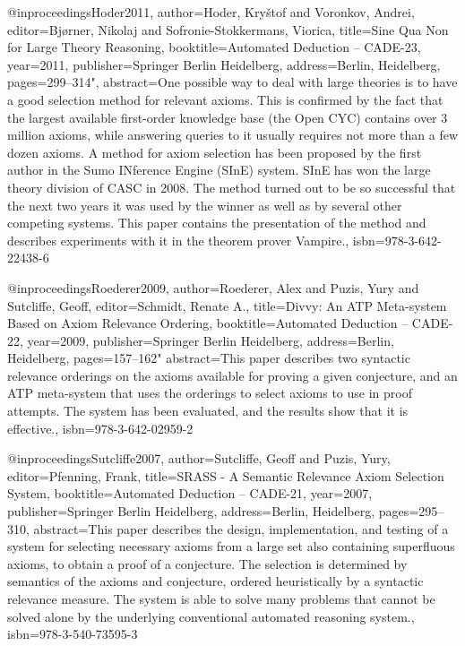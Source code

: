 \documentclass[english,version-2020-11]{uzl-thesis}
\begin{document}
\begin{bibtex-entries}
@inproceedings{Hoder2011,
    author={Hoder, Kry{\v{s}}tof and Voronkov, Andrei},
    editor={Bj{\o}rner, Nikolaj and Sofronie-Stokkermans, Viorica},
    title={Sine Qua Non for Large Theory Reasoning},
    booktitle={Automated Deduction -- CADE-23},
    year={2011},
    publisher={Springer Berlin Heidelberg},
    address={Berlin, Heidelberg},
    pages={299--314"},
    abstract={One possible way to deal with large theories is to have a good selection method for relevant axioms. This is confirmed by the fact that the largest available first-order knowledge base (the Open CYC) contains over 3 million axioms, while answering queries to it usually requires not more than a few dozen axioms. A method for axiom selection has been proposed by the first author in the Sumo INference Engine (SInE) system. SInE has won the large theory division of CASC in 2008. The method turned out to be so successful that the next two years it was used by the winner as well as by several other competing systems. This paper contains the presentation of the method and describes experiments with it in the theorem prover Vampire.},
    isbn={978-3-642-22438-6}
}

@inproceedings{Roederer2009,
    author={Roederer, Alex and Puzis, Yury and Sutcliffe, Geoff},
    editor={Schmidt, Renate A.},
    title={Divvy: An ATP Meta-system Based on Axiom Relevance Ordering},
    booktitle={Automated Deduction -- CADE-22},
    year={2009},
    publisher={Springer Berlin Heidelberg},
    address={Berlin, Heidelberg},
    pages={157--162"}
    abstract={This paper describes two syntactic relevance orderings on the axioms available for proving a given conjecture, and an ATP meta-system that uses the orderings to select axioms to use in proof attempts. The system has been evaluated, and the results show that it is effective.},
    isbn={978-3-642-02959-2}
}

@inproceedings{Sutcliffe2007,
    author={Sutcliffe, Geoff and Puzis, Yury},
    editor={Pfenning, Frank},
    title={SRASS - A Semantic Relevance Axiom Selection System},
    booktitle={Automated Deduction -- CADE-21},
    year={2007},
    publisher={Springer Berlin Heidelberg},
    address={Berlin, Heidelberg},
    pages={295--310},
    abstract={This paper describes the design, implementation, and testing of a system for selecting necessary axioms from a large set also containing superfluous axioms, to obtain a proof of a conjecture. The selection is determined by semantics of the axioms and conjecture, ordered heuristically by a syntactic relevance measure. The system is able to solve many problems that cannot be solved alone by the underlying conventional automated reasoning system.},
    isbn={978-3-540-73595-3}
}


\end{bibtex-entries}
\end{document}
